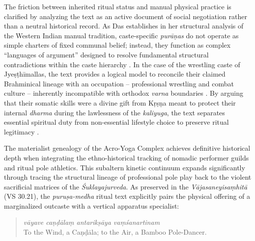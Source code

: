 \documentclass[11pt,twoside,letterpaper]{article}
\begin{document}
The friction between inherited ritual status and manual physical practice is clarified by analyzing the text as an active document of social negotiation rather than a neutral historical record. As Das establishes in her structural analysis of the Western Indian manual tradition, caste-specific \textit{purāṇas} do not operate as simple charters of fixed communal belief; instead, they function as complex ``languages of argument'' designed to resolve fundamental structural contradictions within the caste hierarchy \citep{Das1968}. In the case of the wrestling caste of Jyeṣṭhīmallas, the text provides a logical model to reconcile their claimed Brahminical lineage with an occupation -- professional wrestling and combat culture -- inherently incompatible with orthodox \textit{varna} boundaries \citep{Das1968}. By arguing that their somatic skills were a divine gift from Kṛṣṇa meant to protect their internal \textit{dharma} during the lawlessness of the \textit{kaliyuga}, the text separates essential spiritual duty from non-essential lifestyle choice to preserve ritual legitimacy \citep{Das1968}.

The materialist genealogy of the Acro-Yoga Complex achieves definitive historical depth when integrating the ethno-historical tracking of nomadic performer guilds and ritual pole athletics. This subaltern kinetic continuum expands significantly through tracing the structural lineage of professional pole play back to the violent sacrificial matrices of the \textit{Śuklayajurveda}. As preserved in the \textit{Vājasaneyisaṃhitā} (VS 30.21), the \textit{puruṣa-medha} ritual text explicitly pairs the physical offering of a marginalized outcaste with a vertical apparatus specialist: 

\begin{quote}
\textit{vāyave caṇḍālaṃ antarikṣāya vaṃśanartinam}\\
To the Wind, a Caṇḍāla; to the Air, a Bamboo Pole-Dancer.\\
\end{quote} 
\end{document}
